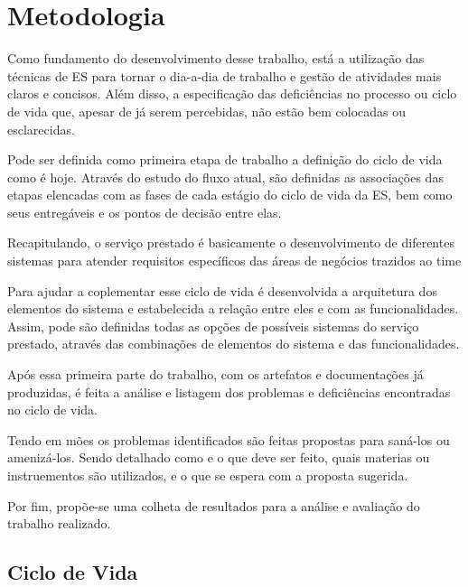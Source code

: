 
\chapter{Metodologia}\label{chap:metodologia}

Como fundamento do desenvolvimento desse trabalho, está a utilização das 
técnicas de ES para tornar o dia-a-dia de trabalho e gestão de 
atividades mais claros e concisos. Além disso, a especificação das deficiências no 
processo ou ciclo de vida que, apesar de já serem percebidas, não estão bem 
colocadas ou esclarecidas.

Pode ser definida como primeira etapa de trabalho a definição do ciclo de vida como 
é hoje. Através do estudo do fluxo atual, são definidas as associações das etapas elencadas com as fases de cada estágio do ciclo de vida da ES, bem como
seus entregáveis e os pontos de decisão entre elas. 

Recapitulando, o serviço prestado é basicamente o desenvolvimento de diferentes 
sistemas para atender requisitos específicos das áreas de negócios trazidos ao time

Para ajudar a coplementar esse ciclo de vida é desenvolvida a arquitetura dos 
elementos do sistema e estabelecida a relação entre eles e com as funcionalidades. Assim, pode são definidas todas as opções de possíveis sistemas do serviço prestado, através das 
combinações de elementos do sistema e das funcionalidades. 

Após essa primeira parte do trabalho, com os artefatos e documentações já 
produzidas, é feita a análise e listagem dos problemas e deficiências 
encontradas no ciclo de vida.

Tendo em mões os problemas identificados são feitas propostas para saná-los ou amenizá-los. Sendo detalhado como e o que deve ser feito,
quais materias ou instruementos são utilizados, e o que se espera com a proposta sugerida. 

Por fim, propõe-se uma colheta de resultados para a análise e 
avaliação do trabalho realizado.

	

	\section{Ciclo de Vida}

